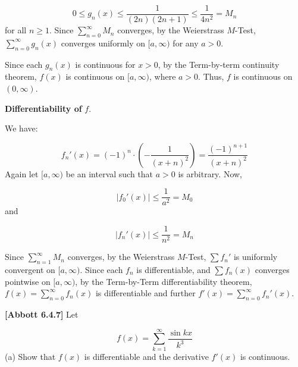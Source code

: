 \documentclass[10pt]{article}
\begin{document}
\begin{equation*}
0\leq g_{n}( x) \leq \frac{1}{( 2n)( 2n+1)} \leq \frac{1}{4n^{2}} =M_{n}
\end{equation*}
for all $\displaystyle n\geq 1$. Since $\displaystyle \sum _{n=0}^{\infty } M_{n}$ converges, by the Weierstrass $\displaystyle M$-Test, $\displaystyle \sum _{n=0}^{\infty } g_{n}( x)$ converges uniformly on $\displaystyle [ a,\infty )$ for any $\displaystyle a >0$. 



Since each $\displaystyle g_{n}( x)$ is continuous for $\displaystyle x >0$, by the Term-by-term continuity theorem, $\displaystyle f( x)$ is continuous on $\displaystyle [ a,\infty )$, where $\displaystyle a >0$. Thus, $\displaystyle f$ is continuous on $\displaystyle ( 0,\infty )$. 



\textbf{Differentiability of }$\displaystyle f$.



We have:


\begin{equation*}
f_{n} '( x) =( -1)^{n} \cdot \left( -\frac{1}{( x+n)^{2}}\right) =\frac{( -1)^{n+1}}{( x+n)^{2}}
\end{equation*}
Again let $\displaystyle [ a,\infty )$ be an interval such that $\displaystyle a >0$ is arbitrary. Now, 


\begin{equation*}
|f_{0} '( x) |\leq \frac{1}{a^{2}} =M_{0}
\end{equation*}
and


\begin{equation*}
|f_{n} '( x) |\leq \frac{1}{n^{2}} =M_{n}
\end{equation*}


Since $\displaystyle \sum _{n=1}^{\infty } M_{n}$ converges, by the Weierstrass $\displaystyle M$-Test, $\displaystyle \sum f_{n} '$ is uniformly convergent on $\displaystyle [ a,\infty )$. Since each $\displaystyle f_{n}$ is differentiable, and $\displaystyle \sum f_{n}( x)$ converges pointwise on $\displaystyle [ a,\infty )$, by the Term-by-Term differentiability theorem, $\displaystyle f( x) =\sum _{n=0}^{\infty } f_{n}( x)$ is differentiable and further $\displaystyle f'( x) =\sum _{n=0}^{\infty } f_{n} '( x)$.



\textbf{[Abbott 6.4.7]} Let 


\begin{equation*}
f( x) =\sum _{k=1}^{\infty }\frac{\sin kx}{k^{3}}
\end{equation*}
(a) Show that $\displaystyle f( x)$ is differentiable and the derivative $\displaystyle f'( x)$ is continuous. 
\end{document}
